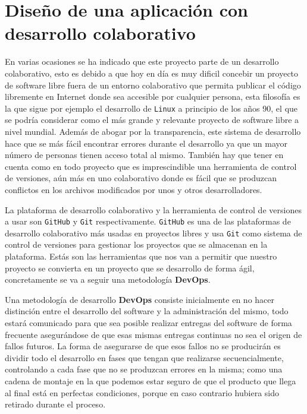 \newpage
\section{Diseño de una aplicación con desarrollo colaborativo}

En varias ocasiones se ha indicado que este proyecto parte de un desarrollo colaborativo, esto es debido a que hoy en día es muy
dificil concebir un proyecto de software libre fuera de un entorno colaborativo que permita publicar el código libremente en
Internet donde sea accesible por cualquier persona, esta filosofía es la que sigue por ejemplo el desarrollo de {\tt Linux}
a principio de los años 90, el que se podría considerar como el más grande y relevante proyecto de software libre a nivel 
mundial. Además de abogar por la transparencia, este sistema de desarrollo hace que se más fácil encontrar errores durante el 
desarrollo ya que un mayor número de personas tienen acceso total al mismo. También hay que tener en cuenta como en todo 
proyecto que es imprescindible una herramienta de control de versiones, aún más en uno colaborativo donde es fácil que se 
produzcan conflictos en los archivos modificados por unos y otros desarrolladores.

\bigskip
La plataforma de desarrollo colaborativo y la herramienta de control de versiones a usar son {\tt GitHub} y {\tt Git} 
respectivamente. {\tt GitHub} es una de las plataformas de desarrollo colaborativo más usadas en proyectos libres y usa 
{\tt Git} como sistema de control de versiones para gestionar los proyectos que se almacenan en la plataforma. Estás son las 
herramientas que nos van a permitir que nuestro proyecto se convierta en un proyecto que se desarrollo de forma ágil, 
concretamente se va a seguir una metodología \textbf{DevOps}.

\bigskip
Una metodología de desarrollo \textbf{DevOps} consiste inicialmente en no hacer distinción entre el desarrollo del software y la
administración del mismo, todo estará comunicado para que sea posible realizar entregas del software de forma frecuente 
asegurándose de que esas mismas entregas continuas no sea el origen de fallos futuros. La forma de asegurarse de que esos
fallos no se producirán es dividir todo el desarrollo en fases que tengan que realizarse secuencialmente, controlando a cada
fase que no se produzcan errores en la misma; como una cadena de montaje en la que podemos estar seguro de que el producto
que llega al final está en perfectas condiciones, porque en caso contrario hubiera sido retirado durante el proceso.

